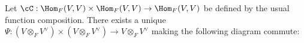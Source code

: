    \begin{proposition}
        Let $\cC: \Hom_F(V,V) \times \Hom_F(V,V) \rightarrow \Hom_F(V,V)$ be defined by the usual function composition. 
        There exists a unique $\Psi: (V \otimes_F V^\vee) \times (V \otimes_F V^\vee) \rightarrow V \otimes_F V^\vee$ making the following diagram commute:
            \begin{center}
            \end{center}
    \end{proposition}

